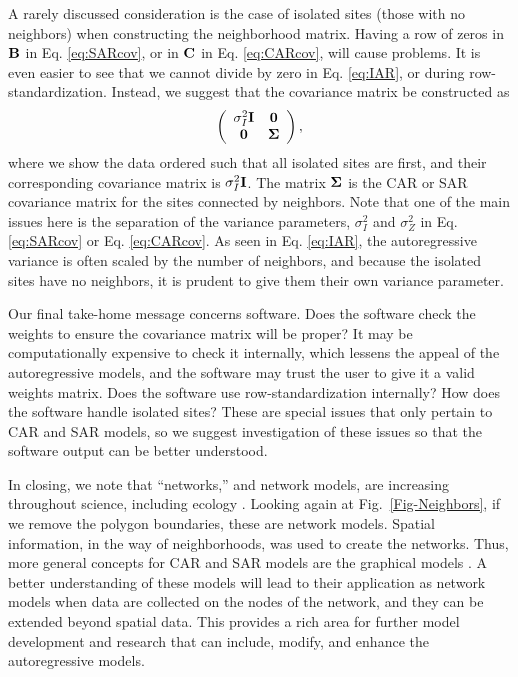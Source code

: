 \documentclass[11pt, titlepage]{article}\usepackage[]{graphicx}\usepackage[]{color}
\begin{document}
\begin{spacing}{1.9}
\begin{flushleft}
A rarely discussed consideration is the case of isolated sites (those with no neighbors) when constructing the neighborhood matrix.  Having a row of zeros in $\mathbf{B}$ in Eq. \ref{eq:SARcov}, or in $\mathbf{C}$ in Eq. \ref{eq:CARcov}, will cause problems.  It is even easier to see that we cannot divide by zero in Eq. \ref{eq:IAR}, or during row-standardization.  Instead, we suggest that the covariance matrix be constructed as
\[
	\left(
	\begin{array}{cc}
			\sigma^2_I \mathbf{I} & \mathbf{0} \\
					\mathbf{0} & \mbox{\boldmath $\Sigma$}
	\end{array}
	\right),
\]
where we show the data ordered such that all isolated sites are first, and their corresponding covariance matrix is $\sigma^2_I\mathbf{I}$.  The matrix $\mbox{\boldmath $\Sigma$}$ is the CAR or SAR covariance matrix for the sites connected by neighbors.  Note that one of the main issues here is the separation of the variance parameters, $\sigma^2_I$ and $\sigma^2_Z$ in Eq. \ref{eq:SARcov} or Eq. \ref{eq:CARcov}.  As seen in Eq. \ref{eq:IAR}, the autoregressive variance is often scaled by the number of neighbors, and because the isolated sites have no neighbors, it is prudent to give them their own variance parameter. 

Our final take-home message concerns software. Does the software check the weights to ensure the covariance matrix will be proper?  It may be computationally expensive to check it internally, which lessens the appeal of the autoregressive models, and the software may trust the user to give it a valid weights matrix. Does the software use row-standardization internally?  How does the software handle isolated sites?  These are special issues that only pertain to CAR and SAR models, so we suggest investigation of these issues so that the software output can be better understood.

In closing, we note that ``networks,'' and network models, are increasing throughout science, including ecology \citep{Borr:Mood:Edel:rise:2014}.  Looking again at Fig.~\ref{Fig-Neighbors}, if we remove the polygon boundaries, these are network models.  Spatial information, in the way of neighborhoods, was used to create the networks.  Thus, more general concepts for CAR and SAR models are the graphical models \citep{Laur:grap:1996, Whit:grap:2009}.  A better understanding of these models will lead to their application as network models when data are collected on the nodes of the network, and they can be extended beyond spatial data. This provides a rich area for further model development and research that can include, modify, and enhance the autoregressive models.


\end{flushleft}
\end{spacing}
\end{document}
